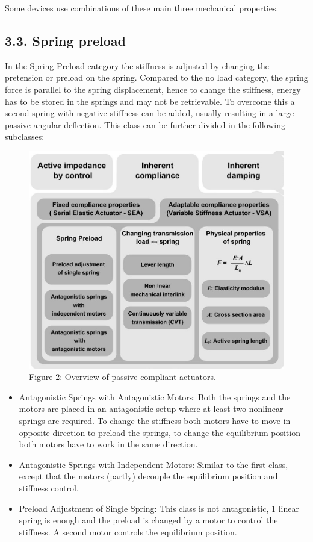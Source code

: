 \documentclass[10pt]{article}
\begin{document}
Some devices use combinations of these main three mechanical properties.

\subsection*{3.3. Spring preload}
In the Spring Preload category the stiffness is adjusted by changing the pretension or preload on the spring. Compared to the no load category, the spring force is parallel to the spring displacement, hence to change the stiffness, energy has to be stored in the springs and may not be retrievable. To overcome this a second spring with negative stiffness can be added, usually resulting in a large passive angular deflection. This class can be further divided in the following subclasses:

\begin{figure}[h]
\begin{center}
  \includegraphics[width=\textwidth]{2025_09_17_f0417c8723605e4ad1efg-08}
\captionsetup{labelformat=empty}
\caption{Figure 2: Overview of passive compliant actuators.}
\end{center}
\end{figure}

\begin{itemize}
  \item Antagonistic Springs with Antagonistic Motors: Both the springs and the motors are placed in an antagonistic setup where at least two nonlinear springs are required. To change the stiffness both motors have to move in opposite direction to preload the springs, to change the equilibrium position both motors have to work in the same direction.
  \item Antagonistic Springs with Independent Motors: Similar to the first class, except that the motors (partly) decouple the equilibrium position and stiffness control.
  \item Preload Adjustment of Single Spring: This class is not antagonistic, 1 linear spring is enough and the preload is changed by a motor to control the stiffness. A second motor controls the equilibrium position.
\end{itemize}
\end{document}
